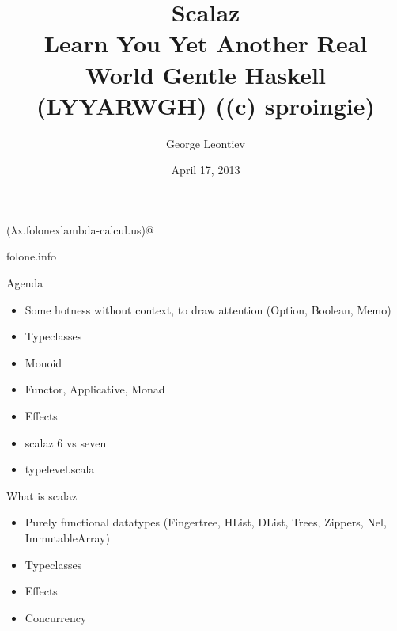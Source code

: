 \documentclass{beamer}
\title[Scalaz]{Scalaz\\Learn You Yet Another Real World Gentle Haskell (LYYARWGH) ((c) sproingie)}
\author{George Leontiev}
\institute{deltamethod GmbH}
\date{April 17, 2013}
\begin{document}
\begin{frame}
\titlepage
\centerline{($\lambda$x.folonexlambda-calcul.us)@}
\centerline{folone.info}
\end{frame}

\begin{frame}{Agenda}
  \begin{itemize}
    \item Some hotness without context, to draw attention (Option, Boolean, Memo)
    \item Typeclasses
    \item Monoid
    \item Functor, Applicative, Monad
    \item Effects
    \item scalaz 6 vs seven
    \item typelevel.scala
  \end{itemize}
\end{frame}

\begin{frame}{What is scalaz}
  \begin{itemize}
    \item Purely functional datatypes (Fingertree, HList, DList, Trees, Zippers, Nel, ImmutableArray)
    \item Typeclasses
    \item Effects
    \item Concurrency
  \end{itemize}
\end{frame}
\end{document}
